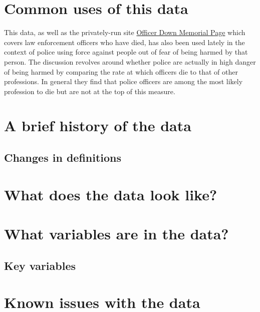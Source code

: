 \documentclass[
  12pt,
  openany]{book}
\begin{document}
\hypertarget{common-uses-of-this-data}{%
\section{Common uses of this data}\label{common-uses-of-this-data}}

This data, as well as the privately-run site \href{https://www.odmp.org/}{Officer Down Memorial Page} which covers law enforcement officers who have died, has also been used lately in the context of police using force against people out of fear of being harmed by that person. The discussion revolves around whether police are actually in high danger of being harmed by comparing the rate at which officers die to that of other professions. In general they find that police officers are among the most likely profession to die but are not at the top of this measure.

\hypertarget{a-brief-history-of-the-data-2}{%
\section{A brief history of the data}\label{a-brief-history-of-the-data-2}}

\hypertarget{changes-in-definitions-2}{%
\subsection{Changes in definitions}\label{changes-in-definitions-2}}

\hypertarget{what-does-the-data-look-like-2}{%
\section{What does the data look like?}\label{what-does-the-data-look-like-2}}

\hypertarget{what-variables-are-in-the-data-2}{%
\section{What variables are in the data?}\label{what-variables-are-in-the-data-2}}

\hypertarget{key-variables-2}{%
\subsection{Key variables}\label{key-variables-2}}

\hypertarget{known-issues-with-the-data-2}{%
\section{Known issues with the data}\label{known-issues-with-the-data-2}}
\end{document}
